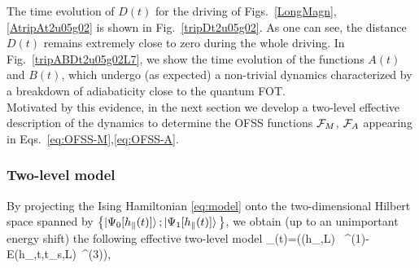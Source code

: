 The time evolution of $D(t)$ for the driving of Figs.~\ref{LongMagn},\ref{AtripAt2u05g02} is shown in Fig.~\ref{tripDt2u05g02}. As one can see, the distance $D(t)$ remains extremely close to zero during the whole driving. In Fig.~\ref{tripABDt2u05g02L7}, we show the time evolution of the functions $A(t)$ and $B(t)$, which undergo (as expected) a non-trivial dynamics characterized by a breakdown of adiabaticity close to the quantum FOT.\\

 Motivated by this evidence, in the next section we develop a two-level effective description of the dynamics to determine the OFSS functions ${\cal F}_M$, ${\cal F}_A$ appearing in Eqs.~\eqref{eq:OFSS-M},\eqref{eq:OFSS-A}.
\subsubsection{Two-level model}\label{sec:2-lev}
By projecting the Ising Hamiltonian \eqref{eq:model} onto the two-dimensional Hilbert space spanned by  $\bigl\{ \ket{\Psi_0[h_\parallel(t)]};\ket{\Psi _1[h_\parallel(t)]} \bigl\}$, we obtain (up to an unimportant energy shift) the following effective two-level model 
\be\label{eq:eff-Ham}
_(t)=\left(\Delta(h_\perp,L) \ \hat\sigma^{(1)}-{\cal E}(h_\perp,t,t_s,L)\ \hat\sigma^{(3)}\right),
\ee
